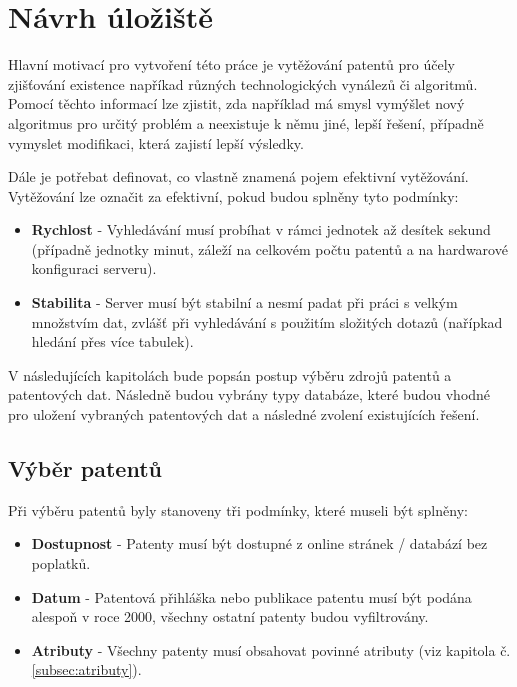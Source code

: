 \chapter{Návrh úložiště}



\indent Hlavní motivací pro vytvoření této práce je vytěžování patentů pro účely zjišťování existence napříkad různých technologických vynálezů či algoritmů. Pomocí těchto informací lze zjistit, zda například má smysl vymýšlet nový algoritmus pro určitý problém a neexistuje k němu jiné, lepší řešení, případně vymyslet modifikaci, která zajistí lepší výsledky.
\newline

\noindent Dále je potřebat definovat, co vlastně znamená pojem efektivní vytěžování. Vytěžování lze označit za efektivní, pokud budou splněny tyto podmínky:
\begin{itemize}
\item \textbf{Rychlost} - Vyhledávání musí probíhat v rámci jednotek až desítek sekund (případně jednotky minut, záleží na celkovém počtu patentů a na hardwarové konfiguraci serveru).
\item \textbf{Stabilita} - Server musí být stabilní a nesmí padat při práci s velkým množstvím dat, zvlášť při vyhledávání s použitím složitých dotazů (nařípkad hledání přes více tabulek).
\end{itemize}

\noindent V následujících kapitolách bude popsán postup výběru zdrojů patentů a patentových dat. Následně budou vybrány typy databáze, které budou vhodné pro uložení vybraných patentových dat a následné zvolení existujících řešení.

\section{Výběr patentů}
Při výběru patentů byly stanoveny tři podmínky, které museli být splněny:
\begin{itemize}
\item \textbf{Dostupnost} - Patenty musí být dostupné z online stránek / databází bez poplatků.
\item \textbf{Datum} - Patentová přihláška nebo publikace patentu musí být podána alespoň v roce 2000, všechny ostatní patenty budou vyfiltrovány.
\item \textbf{Atributy} - Všechny patenty musí obsahovat povinné atributy (viz kapitola č. \ref{subsec:atributy}).
\end{itemize}

